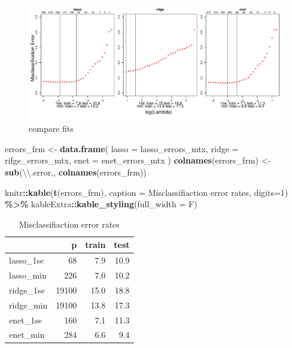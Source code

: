 \documentclass[
]{book}
\newenvironment{Shaded}{\begin{snugshade}}{\end{snugshade}}
\newcommand{\CharTok}[1]{\textcolor[rgb]{0.31,0.60,0.02}{#1}}
\newcommand{\DataTypeTok}[1]{\textcolor[rgb]{0.13,0.29,0.53}{#1}}
\newcommand{\DecValTok}[1]{\textcolor[rgb]{0.00,0.00,0.81}{#1}}
\newcommand{\KeywordTok}[1]{\textcolor[rgb]{0.13,0.29,0.53}{\textbf{#1}}}
\newcommand{\NormalTok}[1]{#1}
\newcommand{\OperatorTok}[1]{\textcolor[rgb]{0.81,0.36,0.00}{\textbf{#1}}}
\newcommand{\StringTok}[1]{\textcolor[rgb]{0.31,0.60,0.02}{#1}}
\begin{document}
\begin{figure}
\centering
\includegraphics{Static/figures/hcc5hmC-glmnetFit-lookFits-1.pdf}
\caption{\label{fig:hcc5hmC-glmnetFit-lookFits}compare fits}
\end{figure}

\begin{Shaded}
\begin{Highlighting}[]
\NormalTok{errors\_frm <{-}}\StringTok{ }\KeywordTok{data.frame}\NormalTok{(}
  \DataTypeTok{lasso =}\NormalTok{ lasso\_errors\_mtx, }\DataTypeTok{ridge =}\NormalTok{ rifge\_errors\_mtx, }\DataTypeTok{enet =}\NormalTok{ enet\_errors\_mtx}
\NormalTok{)}
\KeywordTok{colnames}\NormalTok{(errors\_frm) <{-}}\StringTok{ }\KeywordTok{sub}\NormalTok{(}\StringTok{\textquotesingle{}}\CharTok{\textbackslash{}\textbackslash{}}\StringTok{.error\textquotesingle{}}\NormalTok{,}\StringTok{\textquotesingle{}\textquotesingle{}}\NormalTok{, }\KeywordTok{colnames}\NormalTok{(errors\_frm))}

\NormalTok{knitr}\OperatorTok{::}\KeywordTok{kable}\NormalTok{(}\KeywordTok{t}\NormalTok{(errors\_frm),}
 \DataTypeTok{caption =} \StringTok{\textquotesingle{}Misclassifiaction error rates\textquotesingle{}}\NormalTok{,}
 \DataTypeTok{digits=}\DecValTok{1}\NormalTok{) }\OperatorTok{\%>\%}\StringTok{ }
\StringTok{  }\NormalTok{kableExtra}\OperatorTok{::}\KeywordTok{kable\_styling}\NormalTok{(}\DataTypeTok{full\_width =}\NormalTok{ F)}
\end{Highlighting}
\end{Shaded}

\begin{table}

\caption{\label{tab:hcc5hmC-glmnetFit-printErrors}Misclassifiaction error rates}
\centering
\begin{tabular}[t]{l|r|r|r}
\hline
  & p & train & test\\
\hline
lasso\_1se & 68 & 7.9 & 10.9\\
\hline
lasso\_min & 226 & 7.0 & 10.2\\
\hline
ridge\_1se & 19100 & 15.0 & 18.8\\
\hline
ridge\_min & 19100 & 13.8 & 17.3\\
\hline
enet\_1se & 160 & 7.1 & 11.3\\
\hline
enet\_min & 284 & 6.6 & 9.4\\
\hline
\end{tabular}
\end{table}
\end{document}
